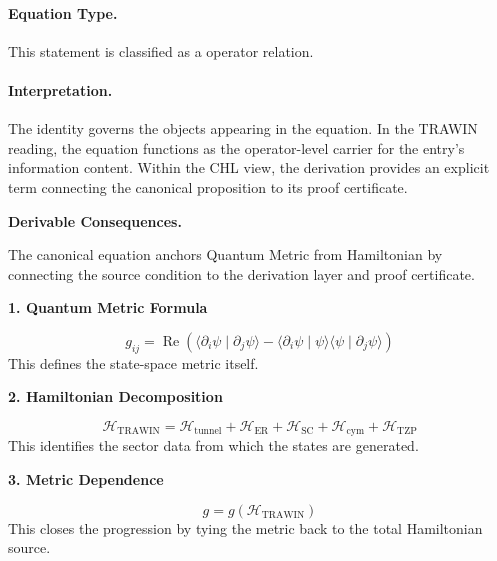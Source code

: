 \paragraph{Equation Type.}
This statement is classified as a operator relation.

\paragraph{Interpretation.}
The identity governs the objects appearing in the equation. In the TRAWIN reading, the equation functions as the operator-level carrier for the entry’s information content. Within the CHL view, the derivation provides an explicit term connecting the canonical proposition to its proof certificate.

\par\vspace{0.35em}
\noindent\textbf{Derivable Consequences.}\quad
\begingroup
\footnotesize
\raggedright
The canonical equation anchors Quantum Metric from Hamiltonian by connecting the source condition to the derivation layer and proof certificate.
\par\endgroup

\noindent\textbf{1. Quantum Metric Formula}\par
\[
g_{ij}
=
\operatorname{Re}\!\left(
\langle \partial_i\psi \mid \partial_j\psi\rangle
-\langle \partial_i\psi \mid \psi\rangle
\langle \psi \mid \partial_j\psi\rangle
\right)
\]
\noindent This defines the state-space metric itself.\par
\noindent\textbf{2. Hamiltonian Decomposition}\par
\[
\mathcal{H}_{\mathrm{TRAWIN}}
=
\mathcal{H}_{\mathrm{tunnel}}+\mathcal{H}_{\mathrm{ER}}+\mathcal{H}_{\mathrm{SC}}+\mathcal{H}_{\mathrm{cym}}+\mathcal{H}_{\mathrm{TZP}}
\]
\noindent This identifies the sector data from which the states are generated.\par
\noindent\textbf{3. Metric Dependence}\par
\[
g=g(\mathcal{H}_{\mathrm{TRAWIN}})
\]
\noindent This closes the progression by tying the metric back to the total Hamiltonian source.\par


